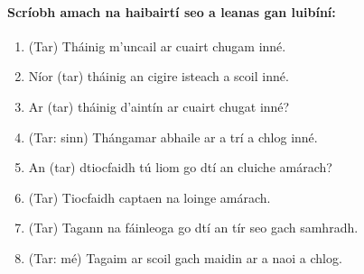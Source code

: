 \documentclass[article,a4paper,oneside,12pt]{memoir}
\begin{document}
\clearpage

\paragraph{Scríobh amach na haibairtí seo a leanas gan luibíní:}

\begin{enumerate}
  \item (Tar) Tháinig m'uncail ar cuairt chugam inn\'{e}.
  \item Níor (tar) tháinig an cigire isteach a scoil inn\'{e}.
  \item Ar (tar) tháinig d'aintín ar cuairt chugat inn\'{e}?
  \item (Tar: sinn) Thángamar abhaile ar a trí a chlog inn\'{e}.
  \item An (tar) dtiocfaidh tú liom go dtí an cluiche amárach?
  \item (Tar) Tiocfaidh captaen na loinge amárach.
  \item (Tar) Tagann na fáinleoga go dtí an tír seo gach samhradh.
  \item (Tar: m\'{e}) Tagaim ar scoil gach maidin ar a naoi a chlog.
\end{enumerate}
\end{document}
